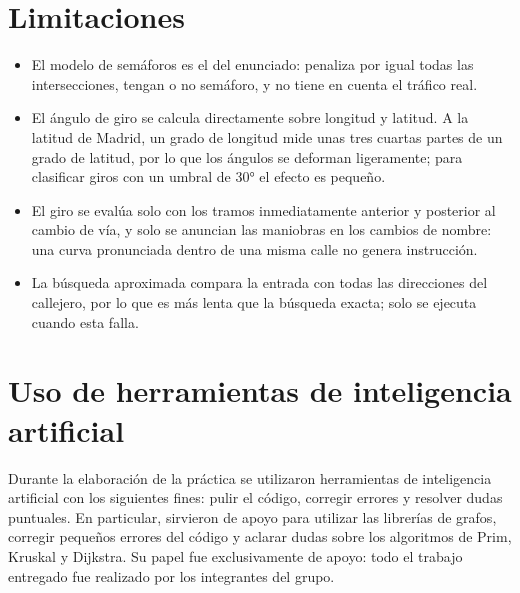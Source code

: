 \documentclass[11pt,a4paper]{article}
\begin{document}
\section{Limitaciones}

\begin{itemize}
\item El modelo de semáforos es el del enunciado: penaliza por igual todas las intersecciones, tengan o no semáforo, y no tiene en cuenta el tráfico real.
\item El ángulo de giro se calcula directamente sobre longitud y latitud. A la latitud de Madrid, un grado de longitud mide unas tres cuartas partes de un grado de latitud, por lo que los ángulos se deforman ligeramente; para clasificar giros con un umbral de 30° el efecto es pequeño.
\item El giro se evalúa solo con los tramos inmediatamente anterior y posterior al cambio de vía, y solo se anuncian las maniobras en los cambios de nombre: una curva pronunciada dentro de una misma calle no genera instrucción.
\item La búsqueda aproximada compara la entrada con todas las direcciones del callejero, por lo que es más lenta que la búsqueda exacta; solo se ejecuta cuando esta falla.
\end{itemize}

\section{Uso de herramientas de inteligencia artificial}

Durante la elaboración de la práctica se utilizaron herramientas de inteligencia artificial con los siguientes fines: pulir el código, corregir errores y resolver dudas puntuales. En particular, sirvieron de apoyo para utilizar las librerías de grafos, corregir pequeños errores del código y aclarar dudas sobre los algoritmos de Prim, Kruskal y Dijkstra. Su papel fue exclusivamente de apoyo: todo el trabajo entregado fue realizado por los integrantes del grupo.

\end{document}

